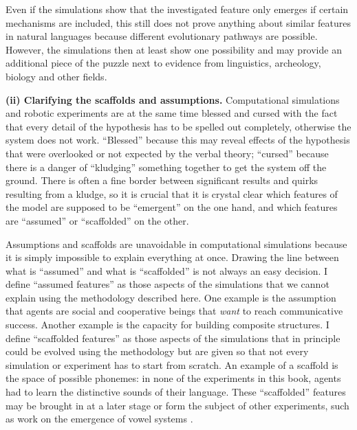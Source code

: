 Even if the simulations show that the investigated feature only emerges if certain mechanisms are included, this still does not prove anything about similar features in natural languages because different evolutionary pathways are possible. However, the simulations then at least show one possibility and may provide an additional piece of the puzzle next to evidence from linguistics, archeology, biology and other fields.

{\bfseries (ii) Clarifying the scaffolds and assumptions.} Computational simulations and robotic experiments are at the same time blessed and cursed with the fact that every detail of the hypothesis has to be spelled out completely, otherwise the system does not work. ``Blessed'' because this may reveal effects of the hypothesis that were overlooked or not expected by the verbal theory; ``cursed'' because there is a danger of ``kludging'' something together to get the system off the ground. There is often a fine border between significant results and quirks resulting from a kludge, so it is crucial that it is crystal clear which features of the model are supposed to be ``emergent'' on the one hand, and which features are ``assumed'' or ``scaffolded'' on the other.

Assumptions and scaffolds are unavoidable in computational simulations because it is simply impossible to explain everything at once. Drawing the line between what is ``assumed'' and what is ``scaffolded'' is not always an easy decision. I define ``assumed features'' as those aspects of the simulations that we cannot explain using the methodology described here. One example is the assumption that agents are social and cooperative beings that {\em want} to reach communicative success. Another example is the capacity for building composite structures. I define ``scaffolded features'' as those aspects of the simulations that in principle could be evolved using the methodology but are given so that not every simulation or experiment has to start from scratch. An example of a scaffold is the space of possible phonemes: in none of the experiments in this book, agents had to learn the distinctive sounds of their language. These ``scaffolded'' features may be brought in at a later stage or form the subject of other experiments, such as work on the emergence of vowel systems \citep{deboer00self, oudeyer05self-organization}.

